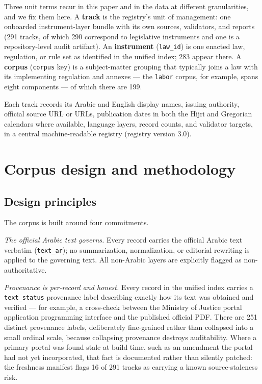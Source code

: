 \documentclass[sn-basic]{sn-jnl}%
\begin{document}
Three unit terms recur in this paper and in the data at different
granularities, and we fix them here. A \textbf{track} is the registry's unit
of management: one onboarded instrument-layer bundle with its own sources,
validators, and reports (291 tracks, of which 290 correspond to legislative
instruments and one is a repository-level audit artifact). An
\textbf{instrument} (\texttt{law\_id}) is one enacted law, regulation, or
rule set as identified in the unified index; 283 appear there. A
\textbf{corpus} (\texttt{corpus} key) is a subject-matter grouping that
typically joins a law with its implementing regulation and annexes --- the
\texttt{labor} corpus, for example, spans eight components --- of which
there are 199.

Each track records its Arabic and English display names, issuing authority,
official source URL or URLs, publication dates in both the Hijri and
Gregorian calendars where available, language layers, record counts, and
validator targets, in a central machine-readable registry (registry version
3.0).

\section{Corpus design and methodology}
\label{sec:design}

\subsection{Design principles}

The corpus is built around four commitments.

\emph{The official Arabic text governs.} Every record carries the official
Arabic text verbatim (\texttt{text\_ar}); no summarization, normalization,
or editorial rewriting is applied to the governing text. All non-Arabic
layers are explicitly flagged as non-authoritative.

\emph{Provenance is per-record and honest.} Every record in the unified
index carries a \texttt{text\_status} provenance label describing exactly how
its text was obtained and verified --- for example, a cross-check between
the Ministry of Justice portal application programming interface and the
published official PDF. There are 251 distinct provenance labels,
deliberately fine-grained rather than collapsed into a small ordinal scale,
because collapsing provenance destroys auditability. Where a primary portal
was found stale at build time, such as an amendment the portal had not yet
incorporated, that fact is documented rather than silently patched: the
freshness manifest flags 16 of 291 tracks as carrying a known
source-staleness risk.
\end{document}
